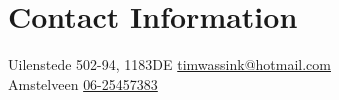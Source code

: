 \section{\sc Contact Information}
Uilenstede 502-94, 1183DE      \hfill \href{mailto:timwassink@hotmail.com}{timwassink@hotmail.com}\\
Amstelveen							 \hfill \href{tel:+31625457383}{06-25457383}\\


